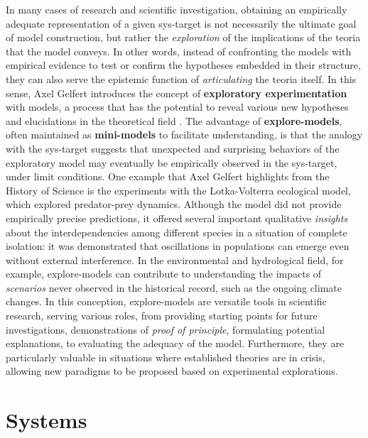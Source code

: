 \documentclass[./main_en.tex]{subfiles}
\begin{document}
\par In many cases of research and scientific investigation, obtaining an empirically adequate representation of a given \gls{sys-target} is not necessarily the ultimate goal of model construction, but rather the \textit{exploration} of the implications of the \gls{teoria} that the \gls{model} conveys. In other words, instead of confronting the models with empirical evidence to test or confirm the hypotheses embedded in their structure, they can also serve the epistemic function of \textit{articulating} the \gls{teoria} itself. In this sense, Axel Gelfert introduces the concept of \textbf{exploratory experimentation} with models, a process that has the potential to reveal various new hypotheses and elucidations in the theoretical field \cite{gelfert2016}. The advantage of \textbf{\gls{explore-models}}, often maintained as \textbf{\gls{mini-models}} to facilitate understanding, is that the \gls{analogy} with the \gls{sys-target} suggests that unexpected and surprising behaviors of the exploratory \gls{model} may eventually be empirically observed in the \gls{sys-target}, under limit conditions. One example that Axel Gelfert highlights from the History of Science is the experiments with the Lotka-Volterra ecological \gls{model}, which explored predator-prey dynamics. Although the \gls{model} did not provide empirically precise predictions, it offered several important qualitative \textit{insights} about the interdependencies among different species in a situation of complete isolation: it was demonstrated that oscillations in populations can emerge even without external interference. In the environmental and hydrological field, for example, \gls{explore-models} can contribute to understanding the impacts of \textit{scenarios} never observed in the historical record, such as the ongoing climate changes. In this conception, \gls{explore-models} are versatile tools in scientific research, serving various roles, from providing starting points for future investigations, demonstrations of \textit{proof of principle}, formulating potential explanations, to evaluating the adequacy of the \gls{model}. Furthermore, they are particularly valuable in situations where established theories are in crisis, allowing new paradigms to be proposed based on experimental explorations.

\section{Systems} \label{sec:sys:systems}
\end{document}
